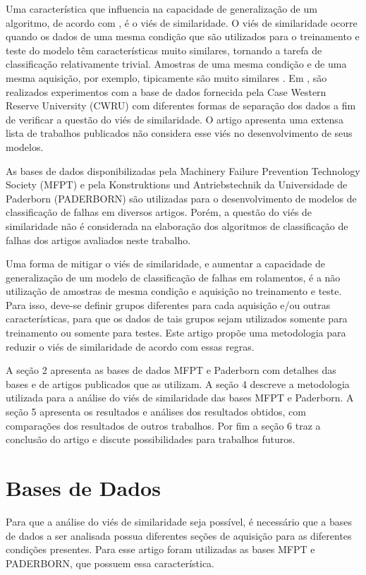 \documentclass[conference]{IEEEtran}
\begin{document}
Uma característica que influencia na capacidade de generalização de um algoritmo, de acordo com \cite{b4}, é o viés de similaridade.
O viés de similaridade ocorre quando os dados de uma mesma condição que são utilizados para o treinamento e teste do modelo têm características muito similares, tornando a tarefa de classificação relativamente trivial.
Amostras de uma mesma condição e de uma mesma aquisição, por exemplo, tipicamente são muito similares \cite{b4}.
Em \cite{b4}, são realizados experimentos com a base de dados fornecida pela Case Western Reserve University (CWRU) com diferentes formas de separação dos dados a fim de verificar a questão do viés de similaridade.
O artigo apresenta uma extensa lista de trabalhos publicados não considera esse viés no desenvolvimento de seus modelos.

As bases de dados disponibilizadas pela Machinery Failure Prevention Technology Society (MFPT) e pela Konstruktions und Antriebstechnik da Universidade de Paderborn (PADERBORN) são utilizadas para o desenvolvimento de modelos de classificação de falhas em diversos artigos.
Porém, a questão do viés de similaridade não é considerada na elaboração dos algoritmos de classificação de falhas dos artigos avaliados neste trabalho.

Uma forma de mitigar o viés de similaridade, e aumentar a capacidade de generalização de um modelo de classificação de falhas em rolamentos, é a não utilização de amostras de mesma condição e aquisição no treinamento e teste.
Para isso, deve-se definir grupos diferentes para cada aquisição e/ou outras características, para que os dados de tais grupos sejam utilizados somente para treinamento ou somente para testes.
Este artigo propõe uma metodologia para reduzir o viés de similaridade de acordo com essas regras.

A seção 2 apresenta as bases de dados MFPT e Paderborn com detalhes das bases e de artigos publicados que as utilizam.
A seção 4 descreve a metodologia utilizada para a análise do viés de similaridade das bases MFPT e Paderborn.
A seção 5 apresenta os resultados e análises dos resultados obtidos, com comparações dos resultados de outros trabalhos.
Por fim a seção 6 traz a conclusão do artigo e discute possibilidades para trabalhos futuros.

\section{Bases de Dados}

Para que a análise do viés de similaridade seja possível, é necessário que a bases de dados a ser analisada possua diferentes seções de aquisição para as diferentes condições presentes.
Para esse artigo foram utilizadas as bases MFPT e PADERBORN, que possuem essa característica.
\end{document}
